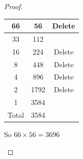 \documentclass[a4paper]{article}
\begin{document}
\begin{eg}
\begin{proof}
\begin{centering}
\begin{enumerate}
\begin{tabular}{|c|c|c|}
          66&56&Delete\\
          \hline
          33&112& \\
          \hline
          16&224&Delete \\
          \hline
          8&448&Delete \\
          \hline
          4&896&Delete \\
          \hline
          2&1792&Delete\\
          \hline
          1&3584&\\
          \hline
          Total & 3584&\\
          \hline          
          \end{tabular}
So $66\times56=3696$
\end{enumerate}
\end{centering}
\end{proof}
\end{eg}
\end{document}
